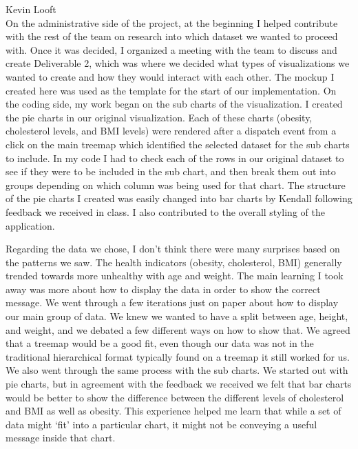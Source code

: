 \documentclass[12pt]{article}
\numberwithin{figure}{section}
\begin{document}
{\sf Kevin Looft}\\
On the administrative side of the project, at the beginning I helped contribute with the rest of the team on research into which dataset we wanted to proceed with. Once it was decided, I organized a meeting with the team to discuss and create Deliverable 2, which was where we decided what types of visualizations we wanted to create and how they would interact with each other. The mockup I created here was used as the template for the start of our implementation. On the coding side, my work began on the sub charts of the visualization. I created the pie charts in our original visualization. Each of these charts (obesity, cholesterol levels, and BMI levels) were rendered after a dispatch event from a click on the main treemap which identified the selected dataset for the sub charts to include. In my code I had to check each of the rows in our original dataset to see if they were to be included in the sub chart, and then break them out into groups depending on which column was being used for that chart. The structure of the pie charts I created was easily changed into bar charts by Kendall following feedback we received in class. I also contributed to the overall styling of the application.

Regarding the data we chose, I don’t think there were many surprises based on the patterns we saw. The health indicators (obesity, cholesterol, BMI) generally trended towards more unhealthy with age and weight. The main learning I took away was more about how to display the data in order to show the correct message. We went through a few iterations just on paper about how to display our main group of data. We knew we wanted to have a split between age, height, and weight, and we debated a few different ways on how to show that. We agreed that a treemap would be a good fit, even though our data was not in the traditional hierarchical format typically found on a treemap it still worked for us. We also went through the same process with the sub charts. We started out with pie charts, but in agreement with the feedback we received we felt that bar charts would be better to show the difference between the different levels of cholesterol and BMI as well as obesity. This experience helped me learn that while a set of data might ‘fit’ into a particular chart, it might not be conveying a useful message inside that chart.
\end{document}
